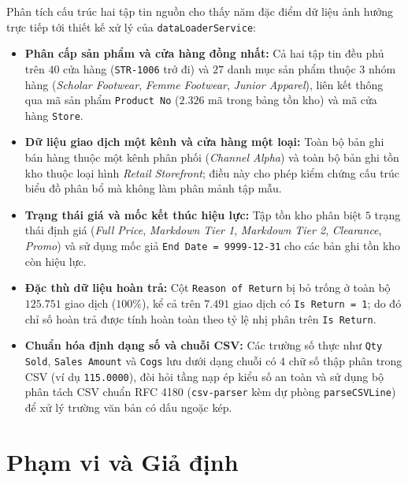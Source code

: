 Phân tích cấu trúc hai tập tin nguồn cho thấy năm đặc điểm dữ liệu ảnh hưởng trực tiếp tới thiết kế xử lý của \texttt{dataLoaderService}:
\begin{itemize}[topsep=0pt, itemsep=1pt]
	\item \textbf{Phân cấp sản phẩm và cửa hàng đồng nhất:} Cả hai tập tin đều phủ trên $40$ cửa hàng (\texttt{STR-1006} trở đi) và $27$ danh mục sản phẩm thuộc $3$ nhóm hàng (\textit{Scholar Footwear}, \textit{Femme Footwear}, \textit{Junior Apparel}), liên kết thông qua mã sản phẩm \texttt{Product No} ($2.326$ mã trong bảng tồn kho) và mã cửa hàng \texttt{Store}.
	\item \textbf{Dữ liệu giao dịch một kênh và cửa hàng một loại:} Toàn bộ bản ghi bán hàng thuộc một kênh phân phối (\textit{Channel Alpha}) và toàn bộ bản ghi tồn kho thuộc loại hình \textit{Retail Storefront}; điều này cho phép kiểm chứng cấu trúc biểu đồ phân bổ mà không làm phân mảnh tập mẫu.
	\item \textbf{Trạng thái giá và mốc kết thúc hiệu lực:} Tập tồn kho phân biệt $5$ trạng thái định giá (\textit{Full Price}, \textit{Markdown Tier 1}, \textit{Markdown Tier 2}, \textit{Clearance}, \textit{Promo}) và sử dụng mốc giả \texttt{End Date = 9999-12-31} cho các bản ghi tồn kho còn hiệu lực.
	\item \textbf{Đặc thù dữ liệu hoàn trả:} Cột \texttt{Reason of Return} bị bỏ trống ở toàn bộ $125.751$ giao dịch ($100\%$), kể cả trên $7.491$ giao dịch có \texttt{Is Return = 1}; do đó chỉ số hoàn trả được tính hoàn toàn theo tỷ lệ nhị phân trên \texttt{Is Return}.
	\item \textbf{Chuẩn hóa định dạng số và chuỗi CSV:} Các trường số thực như \texttt{Qty Sold}, \texttt{Sales Amount} và \texttt{Cogs} lưu dưới dạng chuỗi có $4$ chữ số thập phân trong CSV (ví dụ \texttt{115.0000}), đòi hỏi tầng nạp ép kiểu số an toàn và sử dụng bộ phân tách CSV chuẩn RFC 4180 (\texttt{csv-parser} kèm dự phòng \texttt{parseCSVLine}) để xử lý trường văn bản có dấu ngoặc kép.
\end{itemize}

\section{Phạm vi và Giả định}
\label{sec:scope}

